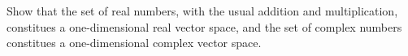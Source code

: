 Show that the set of real numbers, with the usual addition and multiplication, constitues a
one-dimensional real vector space, and the set of complex numbers constitues a one-dimensional complex
vector space.\\